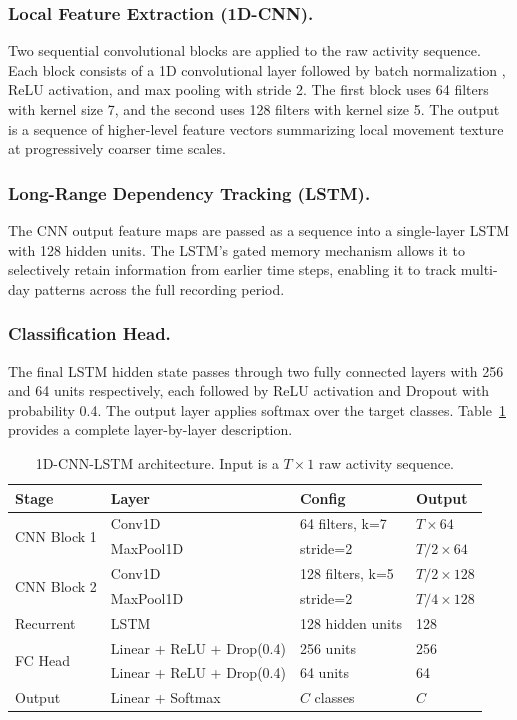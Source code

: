 \subsubsection{Local Feature Extraction (1D-CNN).}
Two sequential convolutional blocks are applied to the raw activity sequence. Each block consists of a 1D convolutional layer followed by batch normalization \cite{ioffe2015batchnorm}, ReLU activation, and max pooling with stride 2. The first block uses 64 filters with kernel size 7, and the second uses 128 filters with kernel size 5. The output is a sequence of higher-level feature vectors summarizing local movement texture at progressively coarser time scales.

\subsubsection{Long-Range Dependency Tracking (LSTM).}
The CNN output feature maps are passed as a sequence into a single-layer LSTM \cite{hochreiter1997lstm} with 128 hidden units. The LSTM's gated memory mechanism allows it to selectively retain information from earlier time steps, enabling it to track multi-day patterns across the full recording period.

\subsubsection{Classification Head.}
The final LSTM hidden state passes through two fully connected layers with 256 and 64 units respectively, each followed by ReLU activation and Dropout \cite{srivastava2014dropout} with probability 0.4. The output layer applies softmax over the target classes. Table~\ref{tab:architecture} provides a complete layer-by-layer description.

\begin{table}
\centering
\caption{1D-CNN-LSTM architecture. Input is a $T \times 1$ raw activity sequence.}
\label{tab:architecture}
\begin{tabular}{llll}
\toprule
\textbf{Stage} & \textbf{Layer} & \textbf{Config} & \textbf{Output} \\
\midrule
\multirow{2}{*}{CNN Block 1} & Conv1D & 64 filters, k=7 & $T \times 64$ \\
 & MaxPool1D & stride=2 & $T/2 \times 64$ \\
\midrule
\multirow{2}{*}{CNN Block 2} & Conv1D & 128 filters, k=5 & $T/2 \times 128$ \\
 & MaxPool1D & stride=2 & $T/4 \times 128$ \\
\midrule
Recurrent & LSTM & 128 hidden units & 128 \\
\midrule
\multirow{2}{*}{FC Head} & Linear + ReLU + Drop(0.4) & 256 units & 256 \\
 & Linear + ReLU + Drop(0.4) & 64 units & 64 \\
\midrule
Output & Linear + Softmax & $C$ classes & $C$ \\
\bottomrule
\end{tabular}
\end{table}

